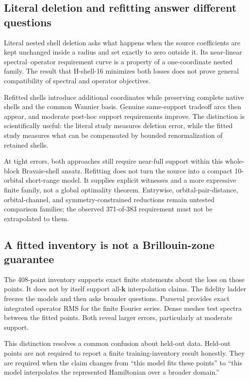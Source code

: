 \documentclass[11pt]{article}
\theoremstyle{definition}
\newcommand{\kvec}{\mathbf k}
\begin{document}
\subsection{Literal deletion and refitting answer different questions}

Literal nested shell deletion asks what happens when the source coefficients are kept
unchanged inside a radius and set exactly to zero outside it.  Its near-linear
spectral--operator requirement curve is a property of a one-coordinate nested family.
The result that H-shell-16 minimizes both losses does not prove general compatibility of
spectral and operator objectives.

Refitted shells introduce additional coordinates while preserving complete native
shells and the common Wannier basis.  Genuine same-support tradeoff arcs then appear,
and moderate post-hoc support requirements improve.  The distinction is scientifically
useful: the literal study measures deletion error, while the fitted study measures what
can be compensated by bounded renormalization of retained shells.

At tight errors, both approaches still require near-full support within this
whole-block Bravais-shell ansatz.  Refitting does not turn the source into a compact
10-orbital short-range model.  It supplies explicit witnesses and a more expressive
finite family, not a global optimality theorem.  Entrywise, orbital-pair-distance,
orbital-channel, and symmetry-constrained reductions remain untested comparison
families; the observed 371-of-383 requirement must not be extrapolated to them.

\subsection{A fitted inventory is not a Brillouin-zone guarantee}

The 408-point inventory supports exact finite statements about the loss on those points.
It does not by itself support all-$\kvec$ interpolation claims.  The fidelity ladder
freezes the models and then asks broader questions.  Parseval provides exact integrated
operator RMS for the finite Fourier series.  Dense meshes test spectra between the
fitted points.  Both reveal larger errors, particularly at moderate support.

This distinction resolves a common confusion about held-out data.  Held-out points are
not required to report a finite training-inventory result honestly.  They are required
when the claim changes from ``this model fits these points'' to ``this model interpolates
the represented Hamiltonian over a broader domain.''
\end{document}
